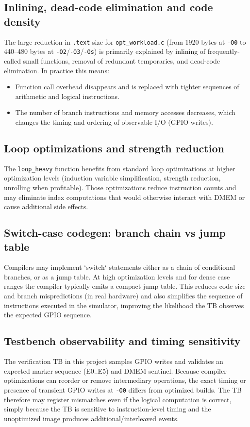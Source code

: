 \subsection{Inlining, dead-code elimination and code density}
The large reduction in \texttt{.text} size for \texttt{opt\_workload.c} (from 1920 bytes at \texttt{-O0} to 440--480 bytes at \texttt{-O2}/\texttt{-O3}/\texttt{-Os}) is primarily explained by inlining of frequently-called small functions, removal of redundant temporaries, and dead-code elimination. In practice this means:
\begin{itemize}
  \item Function call overhead disappears and is replaced with tighter sequences of arithmetic and logical instructions.
  \item The number of branch instructions and memory accesses decreases, which changes the timing and ordering of observable I/O (GPIO writes).
\end{itemize}

\subsection{Loop optimizations and strength reduction}
The \texttt{loop\_heavy} function benefits from standard loop optimizations at higher optimization levels (induction variable simplification, strength reduction, unrolling when profitable). Those optimizations reduce instruction counts and may eliminate index computations that would otherwise interact with DMEM or cause additional side effects.

\subsection{Switch-case codegen: branch chain vs jump table}
Compilers may implement `switch` statements either as a chain of conditional branches, or as a jump table. At high optimization levels and for dense case ranges the compiler typically emits a compact jump table. This reduces code size and branch mispredictions (in real hardware) and also simplifies the sequence of instructions executed in the simulator, improving the likelihood the TB observes the expected GPIO sequence.

\subsection{Testbench observability and timing sensitivity}
The verification TB in this project samples GPIO writes and validates an expected marker sequence (E0..E5) and DMEM sentinel. Because compiler optimizations can reorder or remove intermediary operations, the exact timing or presence of transient GPIO writes at \texttt{-O0} differs from optimized builds. The TB therefore may register mismatches even if the logical computation is correct, simply because the TB is sensitive to instruction-level timing and the unoptimized image produces additional/interleaved events.



